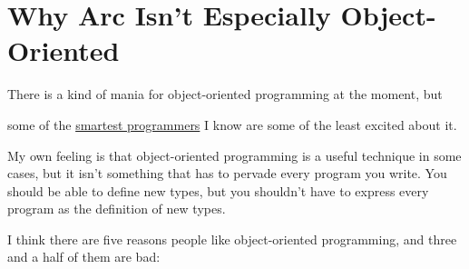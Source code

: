 \chapter{Why Arc Isn't Especially Object-Oriented}


            
              
                


                    There is a kind of mania for object-oriented programming at
                    the moment, but
                    
                    some of the \href{http://www.paulgraham.com/reesoo.html}{smartest programmers} I
                    know are some of the least excited about it.

My
                    own feeling is that object-oriented programming is a useful
                    technique in some cases, but it isn't something that has to
                    pervade every program you write. You should be able to
                    define new types, but you shouldn't have to express every
                    program as the definition of new types.

I think
                    there are five reasons people like object-oriented
                    programming, and three and a half of them are bad:


                  


